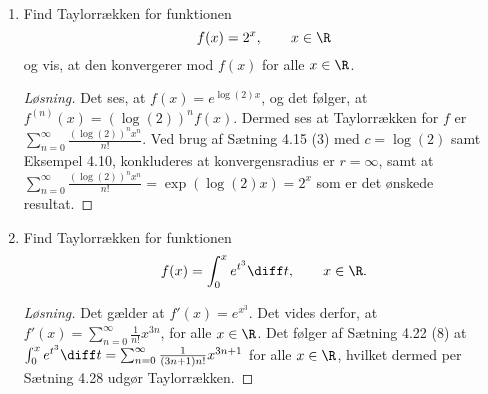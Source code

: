 	\begin{opg}\hfill \\
		\begin{enumerate}
			\item Find Taylorrækken for funktionen $$ f(x)=2^x,\qquad   x\in\R $$ 
			og vis, at den konvergerer mod $ f(x) $ for alle $ x\in \R $.
			\ifanswers
			\begin{proof}[Løsning]
				Det ses, at $ f(x)=e^{\log(2)x} $, og det følger, at $ f^{(n)}(x)=\left(\log(2)\right)^nf(x) $. Dermed ses at Taylorrækken for $ f $ er $ \sum_{n=0}^{\infty}\frac{\left(\log(2)\right)^nx^n}{n!} $. Ved brug af Sætning 4.15 (3) med $ c=\log(2) $ samt Eksempel 4.10, konkluderes at konvergensradius er $ r=\infty $, samt at $ \sum_{n=0}^{\infty}\frac{\left(\log(2)\right)^nx^n}{n!}=\exp(\log(2)x)=2^x $ som er det ønskede resultat.
				
				
			\end{proof}
			\fi
				\item Find Taylorrækken for funktionen $$ f(x)=\int_{0}^{x}e^{t^3}\diff t,\qquad   x\in\R. $$ 
				\ifanswers
				\begin{proof}[Løsning]
				Det gælder at $ f'(x)=e^{x^3} $. Det vides derfor, at $ f'(x)=\sum_{n=0}^{\infty}\frac{1}{n!}x^{3n} $, for alle $ x\in\R $. Det følger af Sætning 4.22 (8) at $ \int_{0}^{x}e^{t^3}\diff t=\sum_{n=0}^{\infty}\frac{1}{(3n+1)n!}x^{3n+1} $ for alle $ x\in \R $, hvilket dermed per Sætning 4.28 udgør Taylorrækken.
				\end{proof}
				\fi
		\end{enumerate}
	\end{opg}
